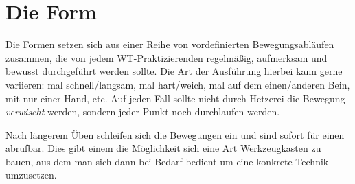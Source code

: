 


\newenvironment{WTSatz}[1]
	{\WTGaleryResetSlideshowCounter \subsection{#1}}
	{}

\newenvironment{WTSatzTeil}[2]
	{\paragraph{#1} (\textit{#2})}
	{}

\def\WTXFormen_EingangsGraphics#1{\texttt{[image: resources/images/eingangsform/\#1]}}


\def\WTSatzTechniken#1{\textbf{Ge\"ubte Techniken}: #1}

\def\WTKurzSatz#1#2#3{\paragraph{#1. #2} #3 (BILD!!! /resources/images/form/siunimtao/kurzsatz/#1.jpg)}




\renewcommand\chapterillustration{pushing_minimalistisch}
\chapter{Die Form}

Die Formen setzen sich aus einer Reihe von vordefinierten Bewegungsabl\"aufen zusammen, die von jedem WT-Praktizierenden regelm\"a{\ss}ig, aufmerksam und bewusst durchgef\"uhrt werden sollte. Die Art der Ausf\"uhrung hierbei kann gerne variieren: mal schnell/langsam, mal hart/weich, mal auf dem einen/anderen Bein, mit nur einer Hand, etc. Auf jeden Fall sollte nicht durch Hetzerei die Bewegung \textit{verwischt} werden, sondern jeder Punkt noch durchlaufen werden.

Nach l\"angerem \"Uben schleifen sich die Bewegungen ein und sind sofort f\"ur einen abrufbar. Dies gibt einem die M\"oglichkeit sich eine Art Werkzeugkasten zu bauen, aus dem man sich dann bei Bedarf bedient um eine konkrete Technik umzusetzen.



